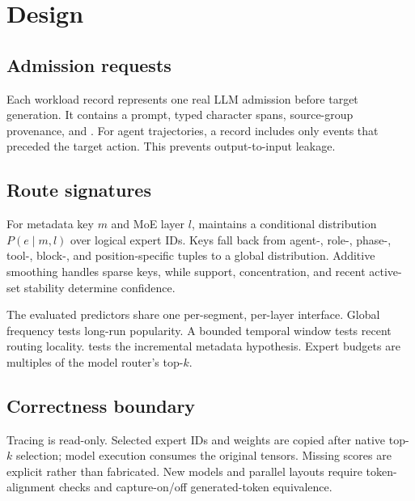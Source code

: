 \section{Design}

\subsection{Admission requests}

Each workload record represents one real LLM admission before target
generation. It contains a prompt, typed character spans, source-group
provenance, and \AgentMeta. For agent trajectories, a record includes only
events that preceded the target action. This prevents output-to-input leakage.

\subsection{Route signatures}

For metadata key $m$ and MoE layer $l$, \RouteSig maintains a conditional
distribution $P(e \mid m,l)$ over logical expert IDs. Keys fall back from
agent-, role-, phase-, tool-, block-, and position-specific tuples to a global
distribution. Additive smoothing handles sparse keys, while support,
concentration, and recent active-set stability determine confidence.

The evaluated predictors share one per-segment, per-layer interface. Global
frequency tests long-run popularity. A bounded temporal window tests recent
routing locality. \RouteSig tests the incremental metadata hypothesis. Expert
budgets are multiples of the model router's top-$k$.

\subsection{Correctness boundary}

Tracing is read-only. Selected expert IDs and weights are copied after native
top-$k$ selection; model execution consumes the original tensors. Missing
scores are explicit rather than fabricated. New models and parallel layouts
require token-alignment checks and capture-on/off generated-token equivalence.

